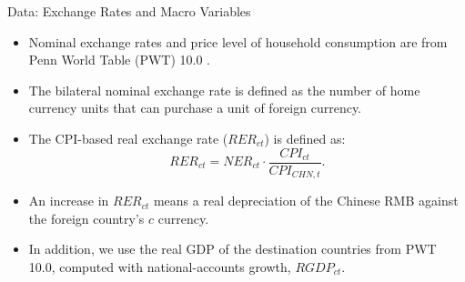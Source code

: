\documentclass[10pt]{beamer}
\begin{document}
\begin{frame}{Data: Exchange Rates and Macro Variables}
	\begin{itemize}
		\item Nominal exchange rates and price level of household consumption are from Penn World Table (PWT) 10.0 \cite{feenstra2015}.
		\item The bilateral nominal exchange rate is defined as the number of home currency units that can purchase a unit of foreign currency.
		\item The CPI-based real exchange rate ($RER_{ct}$) is defined as:
		$$
		RER_{ct}=NER_{ct} \cdot \frac{CPI_{ct}}{CPI_{CHN,t}}.
		$$
		\item An increase in $RER_{ct}$ means a real depreciation of the Chinese RMB against the
		foreign country’s $c$ currency.
		\item In addition, we use the real GDP of the destination countries from PWT 10.0, computed with national-accounts growth, $RGDP_{ct}$.
	\end{itemize}
\end{frame}
\end{document}
